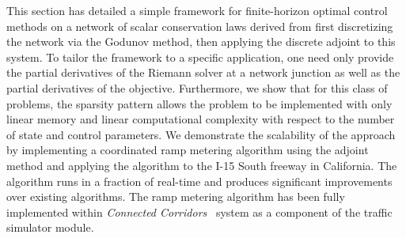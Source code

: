 This section has detailed a simple framework for finite-horizon optimal control 
methods on a network of scalar conservation laws derived from first 
discretizing the network via the Godunov method, then applying the discrete 
adjoint to this system. To tailor the framework to a specific application, one 
need only provide the partial derivatives of the Riemann solver at a network 
junction as well as the partial derivatives of the objective. Furthermore, we 
show that for this class of problems, the sparsity pattern allows the problem 
to be implemented with only linear memory and linear computational complexity 
with respect to the number of state and control parameters. We demonstrate the 
scalability of the approach by implementing a coordinated ramp metering 
algorithm using the adjoint method and applying the algorithm to the I-15 South 
freeway in California. The algorithm runs in a fraction of real-time 
and produces significant improvements over existing algorithms. The ramp 
metering algorithm has been fully implemented within \emph{Connected 
Corridors}~\cite{CC} system as a component of the traffic simulator module.